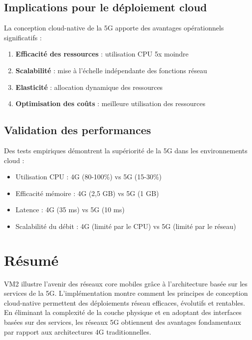 \documentclass[12pt,a4paper]{report}
\begin{document}
\subsection{Implications pour le déploiement cloud}

La conception cloud-native de la 5G apporte des avantages opérationnels significatifs :

\begin{enumerate}
    \item \textbf{Efficacité des ressources} : utilisation CPU 5x moindre
    \item \textbf{Scalabilité} : mise à l'échelle indépendante des fonctions réseau
    \item \textbf{Elasticité} : allocation dynamique des ressources
    \item \textbf{Optimisation des coûts} : meilleure utilisation des ressources
\end{enumerate}

\subsection{Validation des performances}

Des tests empiriques démontrent la supériorité de la 5G dans les environnements cloud :

\begin{itemize}
    \item Utilisation CPU : 4G (80-100\%) vs 5G (15-30\%)
    \item Efficacité mémoire : 4G (2,5 GB) vs 5G (1 GB)
    \item Latence : 4G (35 ms) vs 5G (10 ms)
    \item Scalabilité du débit : 4G (limité par le CPU) vs 5G (limité par le réseau)
\end{itemize}

\section{Résumé}

VM2 illustre l'avenir des réseaux core mobiles grâce à l'architecture basée sur les services de la 5G. L'implémentation montre comment les principes de conception cloud-native permettent des déploiements réseau efficaces, évolutifs et rentables. En éliminant la complexité de la couche physique et en adoptant des interfaces basées sur des services, les réseaux 5G obtiennent des avantages fondamentaux par rapport aux architectures 4G traditionnelles.
\end{document}
